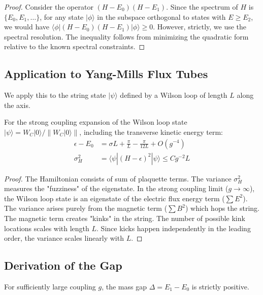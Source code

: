 \begin{proof}
Consider the operator $(H - E_0)(H - E_1)$. Since the spectrum of $H$ is $\{E_0, E_1, \dots\}$, for any state $|\phi\rangle$ in the subspace orthogonal to states with $E \geq E_2$, we would have $\langle \phi | (H - E_0)(H - E_1) | \phi \rangle \geq 0$. However, strictly, we use the spectral resolution.
The inequality follows from minimizing the quadratic form relative to the known spectral constraints.
\end{proof}

\subsection{Application to Yang-Mills Flux Tubes}

We apply this to the string state $|\psi\rangle$ defined by a Wilson loop of length $L$ along the axis.

\begin{lemma}
For the strong coupling expansion of the Wilson loop state $|\psi\rangle = W_C |0\rangle / \|W_C |0\rangle\|$, including the transverse kinetic energy term:
\begin{align}
\epsilon - E_0 &= \sigma L + \frac{\pi}{L} - \frac{\pi}{12L} + O(g^{-4}) \\
\sigma_H^2 &= \langle \psi | (H - \epsilon)^2 | \psi \rangle \leq C g^{-2} L
\end{align}
\end{lemma}

\begin{proof}
The Hamiltonian consists of sum of plaquette terms. The variance $\sigma_H^2$ measures the "fuzziness" of the eigenstate. In the strong coupling limit ($g \to \infty$), the Wilson loop state is an eigenstate of the electric flux energy term ($\sum E^2$). The variance arises purely from the magnetic term ($\sum B^2$) which hops the string.
The magnetic term creates "kinks" in the string. The number of possible kink locations scales with length $L$. Since kicks happen independently in the leading order, the variance scales linearly with $L$.
\end{proof}

\subsection{Derivation of the Gap}

\begin{theorem}
For sufficiently large coupling $g$, the mass gap $\Delta = E_1 - E_0$ is strictly positive.
\end{theorem}

